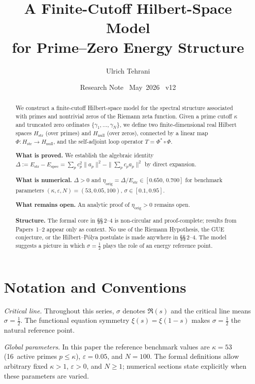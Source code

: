 \documentclass[11pt]{article}
\title{\vspace{-1.5em}\bfseries A Finite-Cutoff Hilbert-Space Model\\[0.4em]
\large for Prime--Zero Energy Structure}
\author{Ulrich Tehrani}
\date{Research Note \textperiodcentered\ May~2026 \textperiodcentered\ v12}
\newcommand{\Hstr}{H_{\mathrm{str}}}
\newcommand{\Hnull}{H_{\mathrm{null}}}
\newcommand{\Estr}{E_{\mathrm{str}}}
\newcommand{\Espec}{E_{\mathrm{spec}}}
\newcommand{\etaorig}{\eta_{\mathrm{orig}}}
\begin{document}
\maketitle

\begin{abstract}
We construct a finite-cutoff Hilbert-space model for the spectral structure
associated with primes and nontrivial zeros of the Riemann zeta function.
Given a prime cutoff $\kappa$ and truncated zero ordinates
$\{\gamma_1,\ldots,\gamma_N\}$, we define two finite-dimensional real
Hilbert spaces $\Hstr$ (over primes) and $\Hnull$ (over zeros),
connected by a linear map $\Phi\colon\Hstr\to\Hnull$, and the
self-adjoint loop operator $T = \Phi^*\circ\Phi$.

\textbf{What is proved.}
We establish the algebraic identity
$\Delta := \Estr - \Espec
 = \sum_p c_p^2\|a_p\|^2 - \|\sum_p c_p a_p\|^2$
by direct expansion.

\textbf{What is numerical.}
$\Delta > 0$ and
$\etaorig = \Delta/\Estr \in [0.650,\,0.700]$ for benchmark parameters
$(\kappa,\varepsilon,N)=(53,0.05,100)$, $\sigma\in[0.1,0.95]$.

\textbf{What remains open.}
An analytic proof of $\etaorig>0$ remains open.

\textbf{Structure.}
The formal core in \S\S\,2--4 is non-circular and proof-complete;
results from Papers~1--2 appear only as context.
No use of the Riemann Hypothesis, the GUE conjecture,
or the Hilbert--P\'olya postulate is made anywhere in \S\S\,2--4.
The model suggests a picture in which $\sigma=\tfrac12$ plays
the role of an energy reference point.
\end{abstract}

\vspace{2em}

\section*{Notation and Conventions}
\label{sec:notation}

\emph{Critical line.}
Throughout this series, $\sigma$ denotes $\Re(s)$ and the critical
line means $\sigma=\tfrac12$. The functional equation symmetry
$\xi(s)=\xi(1-s)$ makes $\sigma=\tfrac12$ the natural reference
point.

\medskip
\emph{Global parameters.}
In this paper the reference benchmark values are
$\kappa=53$ (16~active primes $p\leq\kappa$),
$\varepsilon=0.05$, and $N=100$.
The formal definitions allow arbitrary fixed $\kappa>1$,
$\varepsilon>0$, and $N\geq 1$; numerical sections state
explicitly when these parameters are varied.
\end{document}
